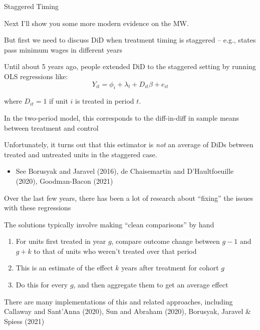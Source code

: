 \documentclass[11pt,english,handout]{beamer}
\newenvironment{wideitemize}{\itemize\addtolength{\itemsep}{10pt}}{\enditemize}
\begin{document}
\begin{frame}{Staggered Timing}
	\begin{wideitemize}
		\item
		Next I'll show you some more modern evidence on the MW.
		
		\item
		But first we need to discuss DiD when treatment timing is staggered -- e.g., states pass minimum wages in different years 
		
		\pause
		\item
		Until about 5 years ago, people extended DiD to the staggered setting by running OLS regressions like:
		$$Y_{it} = \phi_i + \lambda_t + D_{it} \beta + e_{it}$$
		
		\noindent where $D_{it} = 1$ if unit $i$ is treated in period $t$.
		
		\pause
		\item
		In the two-period model, this corresponds to the diff-in-diff in sample means between treatment and control
		
		\pause
		\item 
		Unfortunately, it turns out that this estimator is \textit{not} an average of DiDs between treated and untreated units in the staggered case.
			\begin{itemize}
				\item 
				See Borusyak and Jaravel (2016), de Chaisemartin and D'Haultfoeuille (2020), Goodman-Bacon (2021)
			\end{itemize}
	\end{wideitemize}
\end{frame}

\begin{frame}
	\begin{wideitemize}
		\item
		Over the last few years, there has been a lot of research about ``fixing'' the issues with these regressions
		
		\item
		The solutions typically involve making ``clean comparisons'' by hand
		
		\pause
		\begin{enumerate}
			\item 
			For units first treated in year $g$, compare outcome change between $g-1$ and $g+k$ to that of units who weren't treated over that period
			
			\pause
			\item
			This is an estimate of the effect $k$ years after treatment for cohort $g$
			
			\pause
			\item
			Do this for every $g$, and then aggregate them to get an average effect
		\end{enumerate}

		\pause
		\item 
		There are many implementations of this and related approaches, including Callaway and Sant'Anna (2020), Sun and Abraham (2020), Borusyak, Jaravel \& Spiess (2021)	
	\end{wideitemize}
\end{frame}
\end{document}
